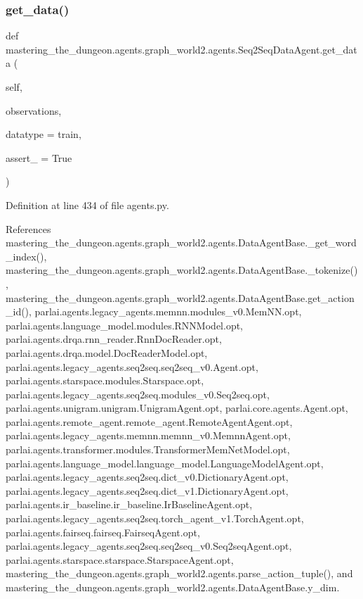 \subsubsection{\texorpdfstring{get\+\_\+data()}{get\_data()}}
{\footnotesize\ttfamily def mastering\+\_\+the\+\_\+dungeon.\+agents.\+graph\+\_\+world2.\+agents.\+Seq2\+Seq\+Data\+Agent.\+get\+\_\+data (\begin{DoxyParamCaption}\item[{}]{self,  }\item[{}]{observations,  }\item[{}]{datatype = {\ttfamily \textquotesingle{}train\textquotesingle{}},  }\item[{}]{assert\+\_\+ = {\ttfamily True} }\end{DoxyParamCaption})}



Definition at line 434 of file agents.\+py.



References mastering\+\_\+the\+\_\+dungeon.\+agents.\+graph\+\_\+world2.\+agents.\+Data\+Agent\+Base.\+\_\+get\+\_\+word\+\_\+index(), mastering\+\_\+the\+\_\+dungeon.\+agents.\+graph\+\_\+world2.\+agents.\+Data\+Agent\+Base.\+\_\+tokenize(), mastering\+\_\+the\+\_\+dungeon.\+agents.\+graph\+\_\+world2.\+agents.\+Data\+Agent\+Base.\+get\+\_\+action\+\_\+id(), parlai.\+agents.\+legacy\+\_\+agents.\+memnn.\+modules\+\_\+v0.\+Mem\+N\+N.\+opt, parlai.\+agents.\+language\+\_\+model.\+modules.\+R\+N\+N\+Model.\+opt, parlai.\+agents.\+drqa.\+rnn\+\_\+reader.\+Rnn\+Doc\+Reader.\+opt, parlai.\+agents.\+drqa.\+model.\+Doc\+Reader\+Model.\+opt, parlai.\+agents.\+legacy\+\_\+agents.\+seq2seq.\+seq2seq\+\_\+v0.\+Agent.\+opt, parlai.\+agents.\+starspace.\+modules.\+Starspace.\+opt, parlai.\+agents.\+legacy\+\_\+agents.\+seq2seq.\+modules\+\_\+v0.\+Seq2seq.\+opt, parlai.\+agents.\+unigram.\+unigram.\+Unigram\+Agent.\+opt, parlai.\+core.\+agents.\+Agent.\+opt, parlai.\+agents.\+remote\+\_\+agent.\+remote\+\_\+agent.\+Remote\+Agent\+Agent.\+opt, parlai.\+agents.\+legacy\+\_\+agents.\+memnn.\+memnn\+\_\+v0.\+Memnn\+Agent.\+opt, parlai.\+agents.\+transformer.\+modules.\+Transformer\+Mem\+Net\+Model.\+opt, parlai.\+agents.\+language\+\_\+model.\+language\+\_\+model.\+Language\+Model\+Agent.\+opt, parlai.\+agents.\+legacy\+\_\+agents.\+seq2seq.\+dict\+\_\+v0.\+Dictionary\+Agent.\+opt, parlai.\+agents.\+legacy\+\_\+agents.\+seq2seq.\+dict\+\_\+v1.\+Dictionary\+Agent.\+opt, parlai.\+agents.\+ir\+\_\+baseline.\+ir\+\_\+baseline.\+Ir\+Baseline\+Agent.\+opt, parlai.\+agents.\+legacy\+\_\+agents.\+seq2seq.\+torch\+\_\+agent\+\_\+v1.\+Torch\+Agent.\+opt, parlai.\+agents.\+fairseq.\+fairseq.\+Fairseq\+Agent.\+opt, parlai.\+agents.\+legacy\+\_\+agents.\+seq2seq.\+seq2seq\+\_\+v0.\+Seq2seq\+Agent.\+opt, parlai.\+agents.\+starspace.\+starspace.\+Starspace\+Agent.\+opt, mastering\+\_\+the\+\_\+dungeon.\+agents.\+graph\+\_\+world2.\+agents.\+parse\+\_\+action\+\_\+tuple(), and mastering\+\_\+the\+\_\+dungeon.\+agents.\+graph\+\_\+world2.\+agents.\+Data\+Agent\+Base.\+y\+\_\+dim.

